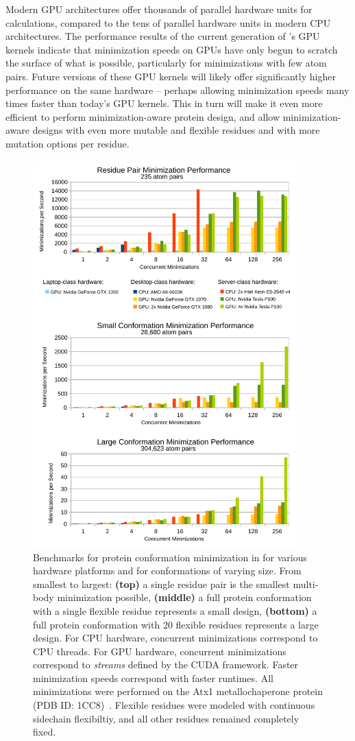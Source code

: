 Modern GPU architectures offer thousands of parallel hardware units for calculations, compared to the tens of parallel hardware units in modern CPU architectures. The performance results of the current generation of \osprey's GPU kernels indicate that minimization speeds on GPUs have only begun to scratch the surface of what is possible, particularly for minimizations with few atom pairs. Future versions of these GPU kernels will likely offer significantly higher performance on the same hardware -- perhaps allowing minimization speeds many times faster than today's GPU kernels.  This in turn will make it even more efficient to perform minimization-aware protein design, and allow minimization-aware designs with even more mutable and flexible residues and with more mutation options per residue.  

\begin{figure}
\center
\includegraphics[width=4in]{figures/gpu.pdf}
\caption{Benchmarks for protein conformation minimization in  for various hardware platforms and for conformations of varying size. From smallest to largest: {\bf (top)} a single residue pair is the smallest multi-body minimization possible, {\bf (middle)} a full protein conformation with a single flexible residue represents a small design, {\bf (bottom)} a full protein conformation with 20 flexible residues represents a large design. For CPU hardware, concurrent minimizations correspond to CPU threads. For GPU hardware, concurrent minimizations correspond to {\it streams} defined by the CUDA framework. Faster minimization speeds correspond with faster \osprey runtimes. All minimizations were performed on the Atx1 metallochaperone protein (PDB ID: 1CC8)~\cite{1CC8}. Flexible residues were modeled with continuous sidechain flexibiltiy, and all other residues remained completely fixed.}
\label{fig:gpu}
\end{figure}
